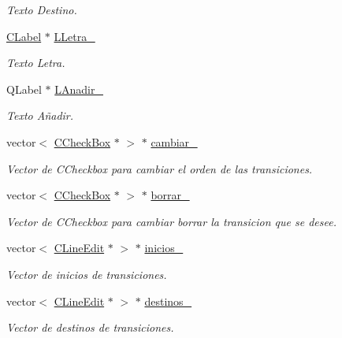 \begin{DoxyCompactItemize}
\begin{DoxyCompactList}\small\item\em Texto Destino. \end{DoxyCompactList}\item 
\hyperlink{classCLabel}{C\+Label} $\ast$ \hyperlink{classCAsistenteCodificacion_a1da0f6a2c6447b3f0f7e7e9267ef278c}{L\+Letra\+\_\+}
\begin{DoxyCompactList}\small\item\em Texto Letra. \end{DoxyCompactList}\item 
Q\+Label $\ast$ \hyperlink{classCAsistenteCodificacion_acd2847b7726990965a4e5aa5d5278805}{L\+Anadir\+\_\+}
\begin{DoxyCompactList}\small\item\em Texto Añadir. \end{DoxyCompactList}\item 
vector$<$ \hyperlink{classCCheckBox}{C\+Check\+Box} $\ast$ $>$ $\ast$ \hyperlink{classCAsistenteCodificacion_a7c50f4349d8de445b66d49a1a34df74a}{cambiar\+\_\+}
\begin{DoxyCompactList}\small\item\em Vector de C\+Checkbox para cambiar el orden de las transiciones. \end{DoxyCompactList}\item 
vector$<$ \hyperlink{classCCheckBox}{C\+Check\+Box} $\ast$ $>$ $\ast$ \hyperlink{classCAsistenteCodificacion_a6cc0224f0b309b0b997b0178ab7e69e6}{borrar\+\_\+}
\begin{DoxyCompactList}\small\item\em Vector de C\+Checkbox para cambiar borrar la transicion que se desee. \end{DoxyCompactList}\item 
vector$<$ \hyperlink{classCLineEdit}{C\+Line\+Edit} $\ast$ $>$ $\ast$ \hyperlink{classCAsistenteCodificacion_ac0ac600fe894126b5273249b1748a267}{inicios\+\_\+}
\begin{DoxyCompactList}\small\item\em Vector de inicios de transiciones. \end{DoxyCompactList}\item 
vector$<$ \hyperlink{classCLineEdit}{C\+Line\+Edit} $\ast$ $>$ $\ast$ \hyperlink{classCAsistenteCodificacion_a421a87b8ddfa213452349bcf55b22d27}{destinos\+\_\+}
\begin{DoxyCompactList}\small\item\em Vector de destinos de transiciones. \end{DoxyCompactList}\item 

\end{DoxyCompactItemize}
